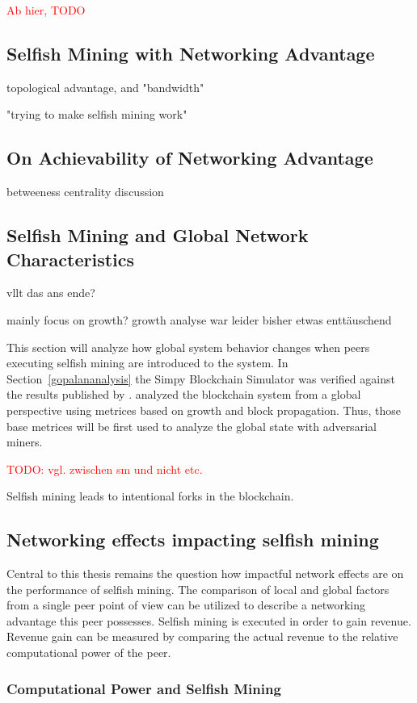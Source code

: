 \ifx
\newpage
\textcolor{red}{Ab hier, TODO}
\subsection{Selfish Mining with Networking Advantage}

topological advantage, and "bandwidth"

"trying to make selfish mining work"
\subsection{On Achievability of Networking Advantage}
betweeness centrality discussion
\subsection{Selfish Mining and Global Network Characteristics}
vllt das ans ende?	

mainly focus on growth? growth analyse war leider bisher etwas enttäuschend

This section will analyze how global system behavior changes when peers executing selfish mining are introduced to the system. In Section~\ref{gopalananalysis} the Simpy Blockchain Simulator was verified against the results published by \gopalan. \gopalan analyzed the blockchain system from a global perspective using metrices based on growth and block propagation. Thus, those base metrices will be first used to analyze the global state with adversarial miners.

\textcolor{red}{TODO: vgl. zwischen sm und nicht etc.}

Selfish mining leads to intentional forks in the blockchain.

  






\subsection{Networking effects impacting selfish mining}
Central to this thesis remains the question how impactful network effects are on the performance of selfish mining. The comparison of local and global factors from a single peer point of view can be utilized to describe a networking advantage this peer possesses.
Selfish mining is executed in order to gain revenue. Revenue gain can be measured by comparing the actual revenue to the relative computational power of the peer.
\subsubsection{Computational Power and Selfish Mining}


